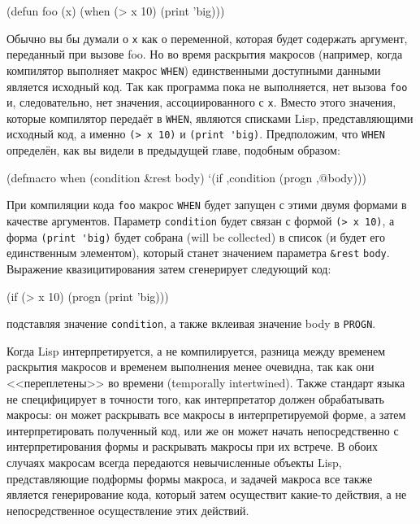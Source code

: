 \begin{myverb}
(defun foo (x)
  (when (> x 10) (print 'big)))
\end{myverb}

Обычно вы бы думали о \lstinline{x} как о переменной, которая будет содержать аргумент,
переданный при вызове foo. Но во время раскрытия макросов (например, когда компилятор
выполняет макрос \lstinline{WHEN}) единственными доступными данными является исходный
код. Так как программа пока не выполняется, нет вызова \lstinline{foo} и, следовательно, нет
значения, ассоциированного с \lstinline{x}. Вместо этого значения, которые компилятор передаёт
в \lstinline{WHEN}, являются списками Lisp, представляющими исходный код, а именно 
\lstinline{(> x 10)} и \lstinline{(print 'big)}. Предположим, что \lstinline{WHEN} определён, как вы видели в
предыдущей главе, подобным образом:

\begin{myverb}
(defmacro when (condition &rest body)
  `(if ,condition (progn ,@body)))
\end{myverb}

При компиляции кода \lstinline{foo} макрос \lstinline{WHEN} будет запущен с этими двумя формами в
качестве аргументов. Параметр \lstinline{condition} будет связан с формой \lstinline{(> x 10)}, а
форма \lstinline{(print 'big)} будет собрана (will be collected) в список (и будет его
единственным элементом), который станет значением параметра \lstinline!&rest!
\lstinline{body}. Выражение квазицитирования затем сгенерирует следующий код:

\begin{myverb}
(if (> x 10) (progn (print 'big)))
\end{myverb}

\noindent{}подставляя значение \lstinline{condition}, а также вклеивая значение body в \lstinline{PROGN}.

Когда Lisp интерпретируется, а не компилируется, разница между временем раскрытия макросов
и временем выполнения менее очевидна, так как они <<переплетены>> во времени (temporally
intertwined). Также стандарт языка не специфицирует в точности того, как интерпретатор должен
обрабатывать макросы: он может раскрывать все макросы в интерпретируемой форме, а затем
интерпретировать полученный код, или же он может начать непосредственно с интерпретирования
формы и раскрывать макросы при их встрече. В обоих случаях макросам всегда передаются
невычисленные объекты Lisp, представляющие подформы формы макроса, и задачей макроса все
также является генерирование кода, который затем осуществит какие-то действия, а не
непосредственное осуществление этих действий.

